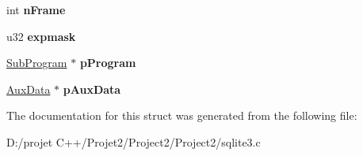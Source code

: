 \begin{DoxyCompactItemize}
\mbox{\label{struct_vdbe_a27fbd083a0335ac2b332d37ea2b90bdc}} 
int {\bfseries n\+Frame}
\item 
\mbox{\label{struct_vdbe_a5e22eedb6ee963a0bcf27fc9fd8b8e43}} 
u32 {\bfseries expmask}
\item 
\mbox{\label{struct_vdbe_a9239ea72573142101328be15c90de62b}} 
\mbox{\hyperlink{struct_sub_program}{Sub\+Program}} $\ast$ {\bfseries p\+Program}
\item 
\mbox{\label{struct_vdbe_a43c515d3521658be7f7e33e4eb2aa136}} 
\mbox{\hyperlink{struct_aux_data}{Aux\+Data}} $\ast$ {\bfseries p\+Aux\+Data}
\end{DoxyCompactItemize}


The documentation for this struct was generated from the following file\+:\begin{DoxyCompactItemize}
\item 
D\+:/projet C++/\+Projet2/\+Project2/\+Project2/sqlite3.\+c\end{DoxyCompactItemize}
